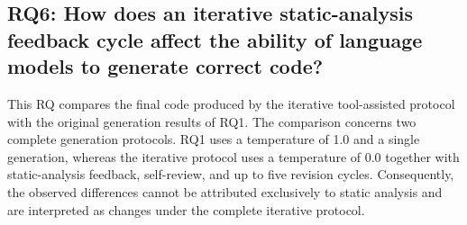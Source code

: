 \subsection{RQ6: How does an iterative static-analysis feedback cycle affect the ability of language models to generate correct code?}
\label{sec:rq6}

This RQ compares the final code produced by the iterative tool-assisted protocol with the original generation results of RQ1. The comparison concerns two complete generation protocols. RQ1 uses a temperature of 1.0 and a single generation, whereas the iterative protocol uses a temperature of 0.0 together with static-analysis feedback, self-review, and up to five revision cycles. Consequently, the observed differences cannot be attributed exclusively to static analysis and are interpreted as changes under the complete iterative protocol.

